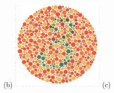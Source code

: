 \documentclass[	12pt, Times, openright, twoside, a4paper, english, brazil]{abntex2}
\begin{document}
\begin{apendicesenv}
\begin{figure}[!htb]
(b)
\endminipage\hfill
{}
\centering
{\includegraphics[width=\linewidth]{ishihara-transformacao/figureIshihara7.png}}
(c)
\endminipage\hfill


\end{figure}
\end{apendicesenv}
\end{document}

